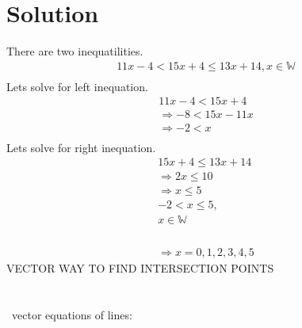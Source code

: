 \documentclass[11pt,two column]{article}
\begin{document}
 \section*{Solution}
There are two inequatilities.\\
\begin{align}
 11x-4 < 15x+4\le13x+14\nonumber,  x\in \mathbb{W}\\
\end{align}
Lets solve for left inequation.
\begin{align}
 11x-4<15x+4\\
 \Rightarrow -8<15x-11x\nonumber\\
 \Rightarrow-2<x\nonumber\\\nonumber
 \end{align}
 Lets solve for right inequation.\\
\begin{align}
  15x+4\le13x+14\\
\Rightarrow 2x\le10\nonumber\\
\Rightarrow x\le5\nonumber\\
 -2 < x\le5,\nonumber\\\nonumber
x\in \mathbb{W}\\\nonumber\\\nonumber\\\nonumber\\\nonumber\\\nonumber
\Rightarrow x=0,1,2,3,4,5 \nonumber
\end{align}
VECTOR WAY TO FIND INTERSECTION POINTS\\\\\\\
vector equations of lines:
\end{document}
